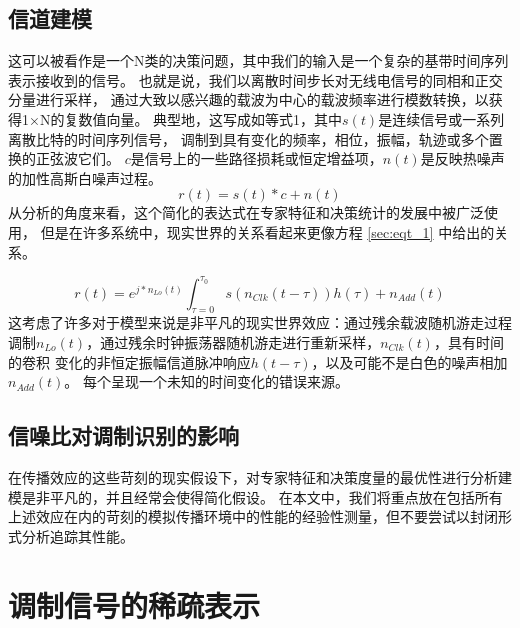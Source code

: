 \subsection{信道建模}
这可以被看作是一个N类的决策问题，其中我们的输入是一个复杂的基带时间序列表示接收到的信号。
也就是说，我们以离散时间步长对无线电信号的同相和正交分量进行采样，
通过大致以感兴趣的载波为中心的载波频率进行模数转换，以获得1×N的复数值向量。
典型地，这写成如等式1，其中$s(t)$是连续信号或一系列离散比特的时间序列信号，
调制到具有变化的频率，相位，振幅，轨迹或多个置换的正弦波它们。
 $c$是信号上的一些路径损耗或恒定增益项，$n(t)$是反映热噪声的加性高斯白噪声过程。
\begin{equation}\label{sec:eqt_1}
r(t) = s(t)*c + n(t)
\end{equation}
从分析的角度来看，这个简化的表达式在专家特征和决策统计的发展中被广泛使用，
但是在许多系统中，现实世界的关系看起来更像方程 \ref{sec:eqt_1} 中给出的关系。\par
\begin{equation}
	r(t) = e^{j*n_{Lo}(t)} \int_{\tau=0}^{\tau_{0}} s(n_{Clk}(t-\tau))h(\tau) + n_{Add}(t)
\end{equation}
这考虑了许多对于模型来说是非平凡的现实世界效应：通过残余载波随机游走过程调制$n_{Lo}(t)$，通过残余时钟振荡器随机游走进行重新采样，$n_{Clk}(t)$，具有时间的卷积 变化的非恒定振幅信道脉冲响应$h(t-\tau)$，以及可能不是白色的噪声相加$n_{Add}(t)$。 每个呈现一个未知的时间变化的错误来源。\par

\subsection{信噪比对调制识别的影响}
在传播效应的这些苛刻的现实假设下，对专家特征和决策度量的最优性进行分析建模是非平凡的，并且经常会使得简化假设。 在本文中，我们将重点放在包括所有上述效应在内的苛刻的模拟传播环境中的性能的经验性测量，但不要尝试以封闭形式分析追踪其性能。


\section{调制信号的稀疏表示}


